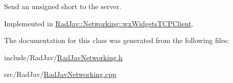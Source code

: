 Send an unsigned short to the server. 



Implemented in \hyperlink{class_rad_jav_1_1_networking_1_1wx_widgets_t_c_p_client_a5598335792abf5f93668fd55386e0487}{Rad\+Jav\+::\+Networking\+::wx\+Widgets\+T\+C\+P\+Client}.



The documentation for this class was generated from the following files\+:\begin{DoxyCompactItemize}
\item 
include/\+Rad\+Jav/\hyperlink{_rad_jav_networking_8h}{Rad\+Jav\+Networking.\+h}\item 
src/\+Rad\+Jav/\hyperlink{_rad_jav_networking_8cpp}{Rad\+Jav\+Networking.\+cpp}\end{DoxyCompactItemize}
